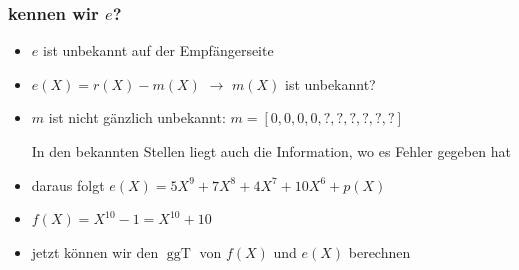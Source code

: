 \documentclass[11pt,aspectratio=169]{beamer}
\begin{document}
	\begin{frame}
		\frametitle{kennen wir $e$?}
		
		\begin{itemize}
			
			\item $e$ ist unbekannt auf der Empfängerseite
			
			\vspace{10pt}
			
			\item $e(X) = r(X) - m(X)$ \qquad $\rightarrow$ \qquad $m(X)$ ist unbekannt?
			
			\vspace{10pt}
			
			\item $m$ ist nicht gänzlich unbekannt: $m = [0,0,0,0,?,?,?,?,?,?]$
			
			In den bekannten Stellen liegt auch die Information, wo es Fehler gegeben hat
			
			\vspace{10pt}
			
			\item daraus folgt $e(X) = 5X^9 + 7X^8 + 4X^7 + 10X^6 + p(X)$
			
			\vspace{10pt}
			
			\item $f(X) = X^{10} - 1 = X^{10} + 10$
			
			\vspace{10pt}
			
			\item jetzt können wir den $\operatorname{ggT}$ von $f(X)$ und $e(X)$ berechnen
		\end{itemize}
		
	\end{frame}
\end{document}

